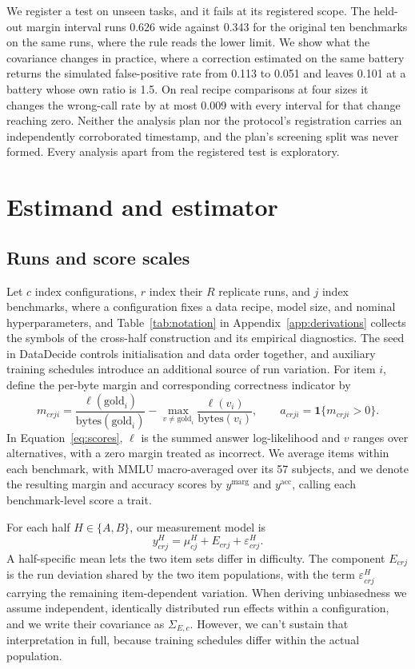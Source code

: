\documentclass{article}
\begin{document}
We register a test on unseen tasks, and it fails at its registered scope. The held-out margin interval runs 0.626 wide against 0.343 for the original ten benchmarks on the same runs, where the rule reads the lower limit. We show what the covariance changes in practice, where a correction estimated on the same battery returns the simulated false-positive rate from 0.113 to 0.051 and leaves 0.101 at a battery whose own ratio is 1.5. On real recipe comparisons at four sizes it changes the wrong-call rate by at most 0.009 with every interval for that change reaching zero. Neither the analysis plan nor the protocol's registration carries an independently corroborated timestamp, and the plan's screening split was never formed. Every analysis apart from the registered test is exploratory.

\section{Estimand and estimator}
\label{sec:estimator}
\subsection{Runs and score scales}
Let $c$ index configurations, $r$ index their $R$ replicate runs, and $j$ index benchmarks, where a configuration fixes a data recipe, model size, and nominal hyperparameters, and Table~\ref{tab:notation} in Appendix~\ref{app:derivations} collects the symbols of the cross-half construction and its empirical diagnostics. The seed in DataDecide controls initialisation and data order together, and auxiliary training schedules introduce an additional source of run variation. For item $i$, define the per-byte margin and corresponding correctness indicator by
\begin{equation}
m_{crji}=\frac{\ell(\mathrm{gold}_i)}{\mathrm{bytes}(\mathrm{gold}_i)}-
\max_{v\ne\mathrm{gold}_i}\frac{\ell(v_i)}{\mathrm{bytes}(v_i)},
\qquad a_{crji}=\mathbf{1}\{m_{crji}>0\}.
\label{eq:scores}
\end{equation}
In Equation~\ref{eq:scores}, $\ell$ is the summed answer log-likelihood and $v$ ranges over alternatives, with a zero margin treated as incorrect. We average items within each benchmark, with MMLU macro-averaged over its 57 subjects, and we denote the resulting margin and accuracy scores by $y^{\mathrm{marg}}$ and $y^{\mathrm{acc}}$, calling each benchmark-level score a trait.

For each half $H\in\{A,B\}$, our measurement model is
\begin{equation}
y^H_{crj}=\mu^H_{cj}+E_{crj}+\varepsilon^H_{crj}.
\end{equation}
A half-specific mean lets the two item sets differ in difficulty. The component $E_{crj}$ is the run deviation shared by the two item populations, with the term $\varepsilon^H_{crj}$ carrying the remaining item-dependent variation. When deriving unbiasedness we assume independent, identically distributed run effects within a configuration, and we write their covariance as $\Sigma_{E,c}$. However, we can't sustain that interpretation in full, because training schedules differ within the actual population.
\end{document}
